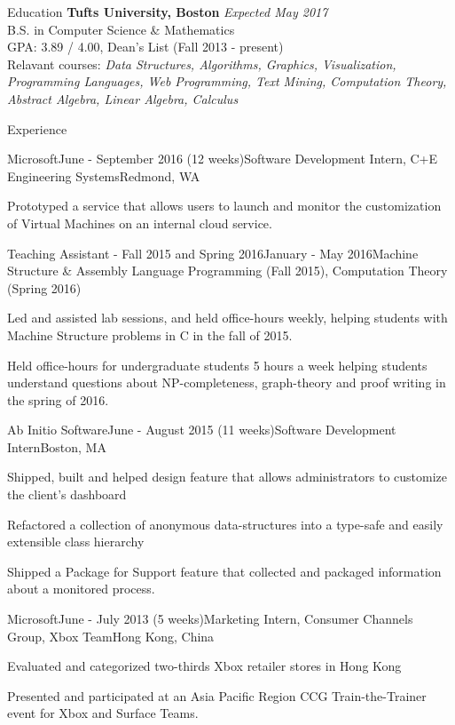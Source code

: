 \documentclass{resume}
\begin{document}
  \begin{rSection}{Education}
    {\bf Tufts University, Boston} \hfill {\em Expected May 2017} \\ 
    { B.S. in Computer Science \& Mathematics } \\
    GPA: 3.89 / 4.00, Dean's List (Fall 2013 - present)\\
    Relavant courses: 
    \textit{Data Structures, Algorithms, Graphics, Visualization, Programming Languages, Web Programming, Text Mining, Computation Theory, Abstract Algebra, Linear Algebra, Calculus}
  \end{rSection}
  
  \begin{rSection}{Experience}
  
    \begin{rSubsection}{Microsoft}{June - September 2016 (12 weeks)}{Software Development Intern, C+E Engineering Systems}{Redmond, WA}
    \item Prototyped a service that allows users to launch and monitor the customization of Virtual Machines on an internal cloud service.
    \end{rSubsection}

    \begin{rSubsection}{Teaching Assistant - Fall 2015 and Spring 2016}{January - May 2016}{Machine Structure \& Assembly Language Programming (Fall 2015), Computation Theory (Spring 2016)}{}
    \item Led and assisted lab sessions, and held office-hours weekly, helping students with Machine Structure problems in C in the fall of 2015.
    \item Held office-hours for undergraduate students 5 hours a week helping students understand questions about NP-completeness, graph-theory and proof writing in the spring of 2016.
    \end{rSubsection}
  
    \begin{rSubsection}{Ab Initio Software}{June - August 2015 (11 weeks)}{Software Development Intern}{Boston, MA}
    \item Shipped, built and helped design feature that allows administrators to customize the client’s dashboard
    \item Refactored a collection of anonymous data-structures into a type-safe and easily extensible class hierarchy
    \item Shipped a Package for Support feature that collected and packaged information about a monitored process.
    \end{rSubsection}

    \begin{rSubsection}{Microsoft}{June - July 2013 (5 weeks)}{Marketing Intern, Consumer Channels Group, Xbox Team}{Hong Kong, China}
    \item Evaluated and categorized two-thirds Xbox retailer stores in Hong Kong
    \item Presented and participated at an Asia Pacific Region CCG Train-the-Trainer event for Xbox and Surface Teams.
    \end{rSubsection}
  
  \end{rSection}
\end{document}
